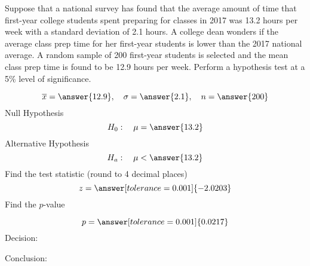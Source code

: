 \documentclass{ximera}
\begin{document}
 
 \begin{problem}\label{prob:140hom8prob1}
Suppose that a national survey has found that the average amount of time that first-year college students spent preparing for classes in 2017 was 13.2 hours per week with a standard deviation of 2.1 hours.  A college dean wonders if the average class prep time for her first-year students is lower than the 2017 national average.  A random sample of 200 first-year students is selected and the mean class prep time is found to be 12.9 hours per week.  Perform a hypothesis test at a 5\% level of significance.

$$\overline{x}=\answer{12.9},\quad \sigma=\answer{2.1},\quad n=\answer{200}$$
Null Hypothesis
$$H_0:\quad \mu=\answer{13.2}$$
Alternative Hypothesis
$$H_a:\quad \mu<\answer{13.2}$$
Find the test statistic (round to 4 decimal places)
$$z=\answer[tolerance=0.001]{-2.0203}$$
Find the $p$-value
\begin{center}  
\end{center}
$$p=\answer[tolerance=0.001]{0.0217}$$
Decision:

\begin{multipleChoice} 
\end{multipleChoice}  

Conclusion:

\begin{multipleChoice} 
\end{multipleChoice} 

\end{problem}
 
\end{document}
